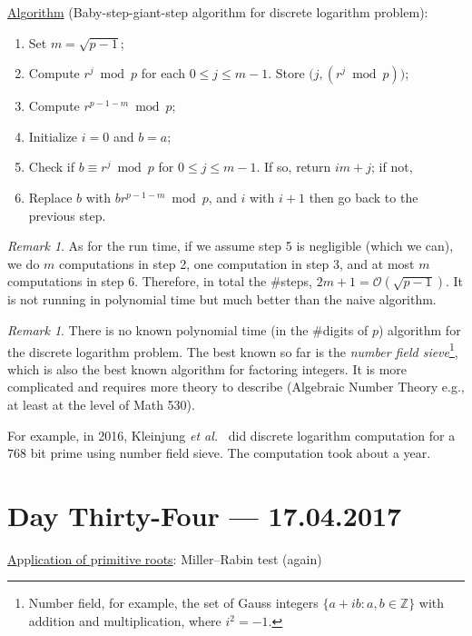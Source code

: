 \documentclass{amsbook}
\theoremstyle{plain}
\theoremstyle{definition}
\theoremstyle{remark}
\newtheorem{remark}[theorem]{Remark}
\numberwithin{equation}{chapter}
\numberwithin{figure}{chapter}
\newcommand{\Z}{\mathbb{Z}}
\begin{document}
\underline{Al}g\underline{orithm} (Baby-step-giant-step algorithm for discrete logarithm problem): 
\begin{enumerate}[label=\arabic*.]
\item Set $m = \sqrt{p-1}$;
\item Compute $r^j \bmod p$ for each $0 \leqslant j \leqslant m - 1$. Store $\big(j, (r^j \bmod p) \big)$;
\item Compute $r^{p-1-m} \bmod p$;
\item Initialize $i = 0$ and $b = a$;
\item Check if $b \equiv r^j \bmod p$ for $0 \leqslant j \leqslant m - 1$. If so, return $im + j$; if not,
\item Replace $b$ with $b r^{p-1-m} \bmod p$, and $i$ with $i + 1$ then go back to the previous step.
\end{enumerate}
\begin{remark}
  As for the run time, if we assume step 5 is negligible (which we can), we do $m$ computations in step 2, one computation in step 3, and at most $m$ computations in step 6. Therefore, in total the \#steps, $2m + 1 = \mathcal{O}(\sqrt{p-1})$. It is not running in polynomial time but much better than the naive algorithm.
\end{remark}
\begin{remark}
  There is no known polynomial time (in the \#digits of $p$) algorithm for the discrete logarithm problem. The best known so far is the \emph{number field sieve}\footnote{Number field, for example, the set of Gauss integers $\{ a + i b : a, b \in \Z \}$ with addition and multiplication, where $i^2 = -1$.}, which is also the best known algorithm for factoring integers. It is more complicated and requires more theory to describe (Algebraic Number Theory e.g., at least at the level of Math 530).

  For example, in 2016, Kleinjung \emph{et al.}~\cite{Kleinjung2017} did discrete logarithm computation for a $768$ bit prime using number field sieve. The computation took about a year. 
\end{remark}

\chapter[Lecture Thirty-Four]{Day Thirty-Four \hfill {\footnotesize \rm --- 17.04.2017}}

\underline{A}pp\underline{lication of }p\underline{rimitive roots}: Miller--Rabin test (again) \\
\end{document}

